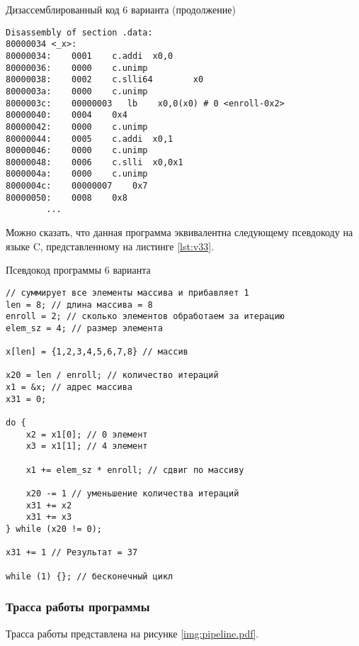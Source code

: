 \newpage

\begin{code}
\caption{Дизассемблированный код 6 варианта (продолжение)}
\label{lst:v23}

\begin{verbatim}
Disassembly of section .data:
80000034 <_x>:
80000034:    0001    c.addi  x0,0
80000036:    0000    c.unimp
80000038:    0002    c.slli64        x0
8000003a:    0000    c.unimp
8000003c:    00000003	lb    x0,0(x0) # 0 <enroll-0x2>
80000040:    0004    0x4
80000042:    0000    c.unimp
80000044:    0005    c.addi  x0,1
80000046:    0000    c.unimp
80000048:    0006    c.slli  x0,0x1
8000004a:    0000    c.unimp
8000004c:    00000007    0x7
80000050:    0008    0x8
        ...

\end{verbatim}
\end{code}

\clearpage
Можно сказать, что данная программа эквивалентна следующему псевдокоду на языке C, представленному на листинге \ref{lst:v33}.

\begin{code}
\caption{Псевдокод программы 6 варианта}
\label{lst:v33}

\begin{verbatim}
// суммирует все элементы массива и прибавляет 1
len = 8; // длина массива = 8
enroll = 2; // сколько элементов обработаем за итерацию
elem_sz = 4; // размер элемента

x[len] = {1,2,3,4,5,6,7,8} // массив

x20 = len / enroll; // количество итераций
x1 = &x; // адрес массива
x31 = 0;

do {
    x2 = x1[0]; // 0 элемент
    x3 = x1[1]; // 4 элемент 

    x1 += elem_sz * enroll; // сдвиг по массиву

    x20 -= 1 // уменьшение количества итераций
    x31 += x2  
    x31 += x3 
} while (x20 != 0);

x31 += 1 // Результат = 37

while (1) {}; // бесконечный цикл
\end{verbatim}
\end{code}



\subsubsection*{Трасса работы программы}
Трасса работы представлена на рисунке \ref{img:pipeline.pdf}.
\clearpage


